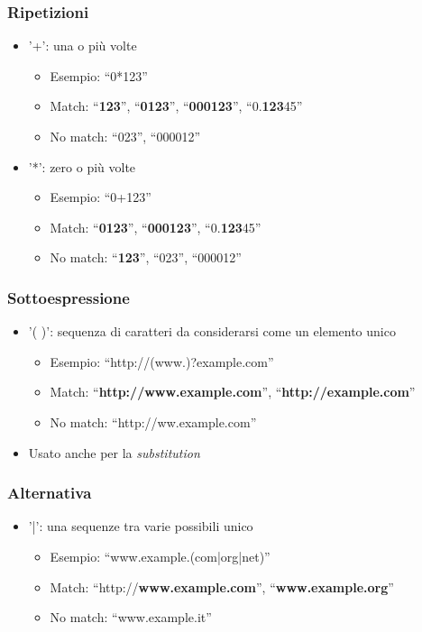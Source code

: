 \documentclass[xetex,table]{beamer}
\begin{document}
\begin{frame}
  \frametitle{Ripetizioni}
  \begin{itemize}
  \item '+': una o più volte
    \begin{itemize}
    \item Esempio: ``0*123''
    \item Match: ``{\bf 123}'', ``{\bf 0123}'', ``{\bf 000123}'', ``0.{\bf 123}45''
    \item No match: ``023'', ``000012''
    \end{itemize}
  \item '*': zero o più volte
    \begin{itemize}
    \item Esempio: ``0+123''
    \item Match: ``{\bf 0123}'', ``{\bf 000123}'', ``0.{\bf 123}45''
    \item No match: ``{\bf 123}'', ``023'', ``000012''
    \end{itemize}
  \end{itemize}
\end{frame}

\begin{frame}
  \frametitle{Sottoespressione}
  \begin{itemize}
  \item '( )': sequenza di caratteri da considerarsi come un elemento
    unico
    \begin{itemize}
    \item Esempio: ``http://(www.)?example.com''
    \item Match: ``{\bf http://www.example.com}'', ``{\bf http://example.com}''
    \item No match: ``http://ww.example.com''
    \end{itemize}
    \item Usato anche per la {\em substitution}
  \end{itemize}
\end{frame}

\begin{frame}
  \frametitle{Alternativa}
  \begin{itemize}
  \item '|': una sequenze tra varie possibili
    unico
    \begin{itemize}
    \item Esempio: ``www.example.(com|org|net)''
    \item Match: ``http://{\bf www.example.com}'', ``{\bf www.example.org}''
    \item No match: ``www.example.it''
    \end{itemize}
  \end{itemize}
\end{frame}
\end{document}
